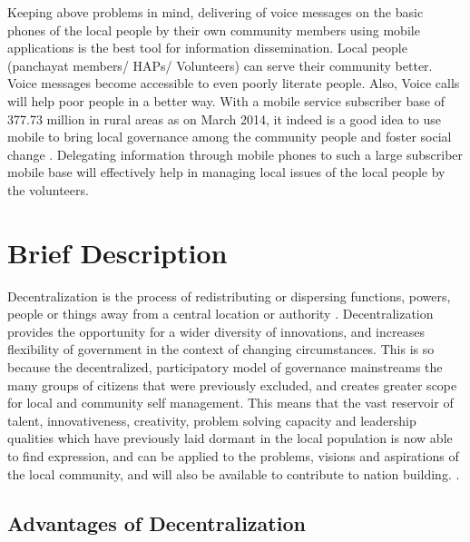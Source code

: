 Keeping above problems in mind, delivering of voice messages on the basic phones of the local people by their own community members using mobile applications is the best tool for information dissemination. Local people (panchayat members/ HAPs/ Volunteers) can serve their community better.  Voice messages become accessible to even poorly literate people. Also, Voice calls will help poor people in a better way. With a mobile service subscriber base of  377.73 million in rural areas as on March 2014, it indeed is a good idea to use mobile to bring local governance among the community people and foster social change \cite{ruralbase:online}. Delegating information through mobile phones to such a  large subscriber mobile base will effectively help in managing local issues of the local people by the volunteers.

\section{Brief Description}
Decentralization is the process of redistributing or dispersing functions, powers, people or things away from a central location or authority \cite{bardhan2002decentralization}. Decentralization provides the opportunity for a wider diversity of innovations, and increases flexibility of government in the context of changing circumstances. This is so because the decentralized, participatory model of governance mainstreams the many groups of citizens that were previously excluded, and creates greater scope for local and community self management. This means that the vast reservoir of talent, innovativeness, creativity, problem solving capacity and leadership qualities which have previously laid dormant in the local population is now able to find expression, and can be applied to the problems, visions and aspirations of the local community, and will also be available to contribute to nation building. \cite{Decentral:online}.

\subsection{Advantages of Decentralization}

